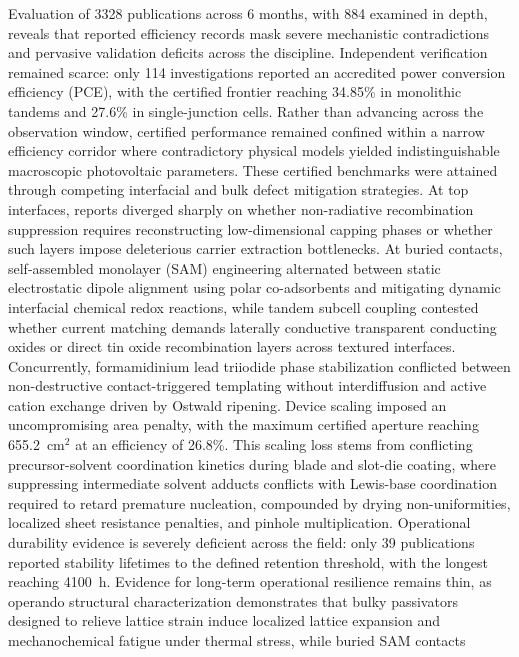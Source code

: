 \documentclass[
  11pt,
]{article}
\begin{document}
Evaluation of 3328 publications across 6 months, with 884 examined in
depth, reveals that reported efficiency records mask severe mechanistic
contradictions and pervasive validation deficits across the discipline.
Independent verification remained scarce: only 114 investigations
reported an accredited power conversion efficiency (PCE), with the
certified frontier reaching 34.85\% in monolithic tandems and 27.6\% in
single-junction cells. Rather than advancing across the observation
window, certified performance remained confined within a narrow
efficiency corridor where contradictory physical models yielded
indistinguishable macroscopic photovoltaic parameters. These certified
benchmarks were attained through competing interfacial and bulk defect
mitigation strategies. At top interfaces, reports diverged sharply on
whether non-radiative recombination suppression requires reconstructing
low-dimensional capping phases or whether such layers impose deleterious
carrier extraction bottlenecks. At buried contacts, self-assembled
monolayer (SAM) engineering alternated between static electrostatic
dipole alignment using polar co-adsorbents and mitigating dynamic
interfacial chemical redox reactions, while tandem subcell coupling
contested whether current matching demands laterally conductive
transparent conducting oxides or direct tin oxide recombination layers
across textured interfaces. Concurrently, formamidinium lead triiodide
phase stabilization conflicted between non-destructive contact-triggered
templating without interdiffusion and active cation exchange driven by
Ostwald ripening. Device scaling imposed an uncompromising area penalty,
with the maximum certified aperture reaching
\qty{655.2}{\centi\meter}\(^2\) at an efficiency of 26.8\%. This scaling
loss stems from conflicting precursor-solvent coordination kinetics
during blade and slot-die coating, where suppressing intermediate
solvent adducts conflicts with Lewis-base coordination required to
retard premature nucleation, compounded by drying non-uniformities,
localized sheet resistance penalties, and pinhole multiplication.
Operational durability evidence is severely deficient across the field:
only 39 publications reported stability lifetimes to the defined
retention threshold, with the longest reaching \qty{4100}{\hour}.
Evidence for long-term operational resilience remains thin, as operando
structural characterization demonstrates that bulky passivators designed
to relieve lattice strain induce localized lattice expansion and
mechanochemical fatigue under thermal stress, while buried SAM contacts
\end{document}

